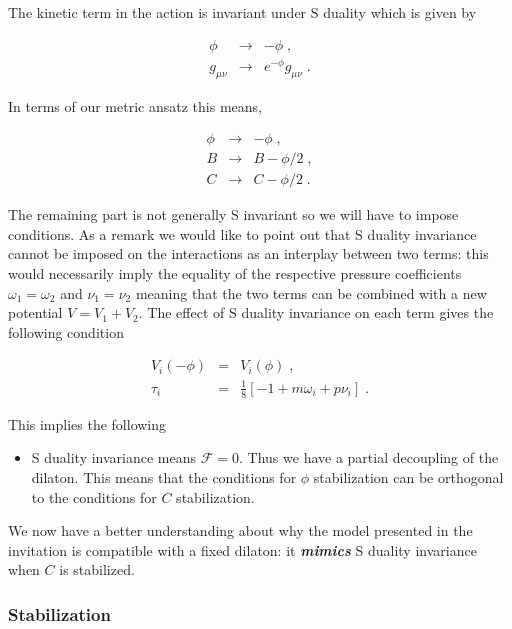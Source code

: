 \documentclass[aps,floatfix,twocolumn,amsmath]{revtex4}
\newcommand{\bea}{\begin{eqnarray}}
\newcommand{\eea}{\end{eqnarray}}
\newcommand{\no}{\noindent}
\begin{document}
The kinetic term in the action is invariant under S duality which is given by

\begin{subequations}
\bea
\phi&\to& -\phi\;,\\
g_{\mu\nu}&\to& e^{-\phi}g_{\mu\nu}\;.
\eea
\end{subequations}

\noindent In terms of our metric ansatz this means, 

\begin{subequations}
\bea
\phi&\to&-\phi\;,\\
B&\to& B-\phi/2\;,\\
C&\to& C-\phi/2\;.
\eea
\end{subequations}

The remaining part is not generally S invariant so we will have to impose conditions. As a remark we would like to point out that
S duality invariance cannot be imposed on the interactions as an interplay between two terms: this
would necessarily imply the equality of the respective pressure coefficients $\omega_{1}=\omega_{2}$ and $\nu_{1}=\nu_{2}$ meaning that the two terms can be combined with a new potential $V=V_{1}+V_{2}$. The effect of S duality invariance on each term gives the following condition

\begin{subequations}\label{sdual}
\bea
V_{i}(-\phi)&=&V_{i}(\phi)\;,\\
\tau_{i}&=&\frac{1}{8}\left[-1+m\omega_{i}+p\nu_{i}\right]\;.
\eea
\end{subequations}


\no This implies the following

\begin{itemize}
\item{} S duality invariance means $\mathcal{F}=0$. Thus we have a partial decoupling of the dilaton. This means that the conditions for $\phi$ stabilization can be orthogonal to the conditions for $C$ stabilization.
\end{itemize}
 
We now have a better understanding about why the model presented in the invitation is compatible with a fixed dilaton: it {\bf{\em{mimics}}} S duality invariance when $C$ is stabilized.

\subsubsection{Stabilization}
\end{document}
